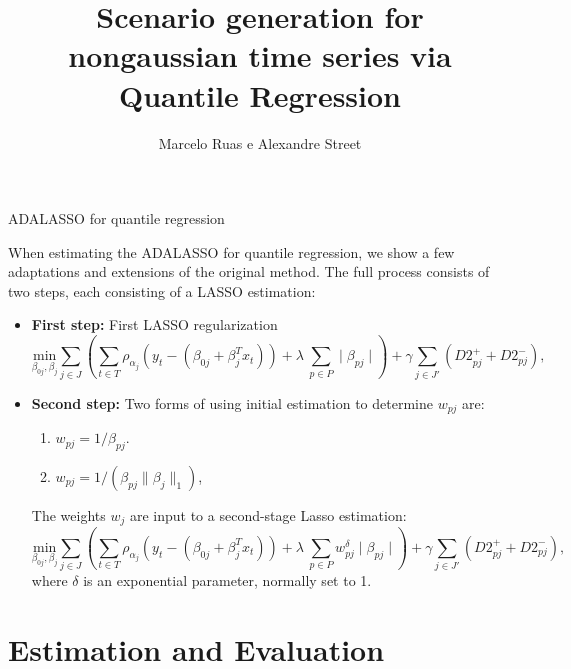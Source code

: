 \documentclass[11pt]{beamer}
\begin{document}
\author{Marcelo Ruas e Alexandre Street}
\title{Scenario generation for nongaussian time series via Quantile Regression}
\begin{frame}[plain]
\maketitle
\end{frame}








\begin{frame}{ADALASSO for quantile regression}
	

\small
When estimating the ADALASSO for quantile regression, we show a few adaptations and extensions of the original method. The full process consists of two steps, each consisting of a LASSO estimation:
\begin{itemize}
	\item \textbf{First step:} First LASSO regularization
	\[
\underset{\beta_{0j},\beta_j}{\text{min}} \sum_{j \in J} \left( \sum_{t\in T}\rho_{\alpha_j}(y_{t}-(\beta_{0j} + \beta_j^T x_t)) + \lambda\  \sum_{p \in P} \mid  \beta_{pj} \mid \right)  + \gamma \sum_{j \in J'} (D2_{pj}^+ + D2_{pj}^-),
\]
	
	\item \textbf{Second step:} Two forms of using initial estimation to determine $w_{pj}$ are:
	\begin{enumerate}
		\item $w_{pj} = 1/ \beta_{pj}$.
		\item $w_{pj} = 1/ (\beta_{pj} \parallel \beta_j \parallel_1)$,
	\end{enumerate}
	The weights $w_j$ are input to a second-stage Lasso estimation:
		\[
	\underset{\beta_{0j},\beta_j}{\text{min}} \sum_{j \in J} \left( \sum_{t\in T}\rho_{\alpha_j}(y_{t}-(\beta_{0j} + \beta_j^T x_t)) + \lambda\  \sum_{p \in P} w_{pj}^\delta \mid  \beta_{pj} \mid \right) + \gamma \sum_{j \in J'} (D2_{pj}^+ + D2_{pj}^-),
	\]
	where $\delta$ is an exponential parameter, normally set to 1.
	
\end{itemize}



\end{frame}

\section{Estimation and Evaluation}\label{estimation-and-evaluation}
\end{document}
